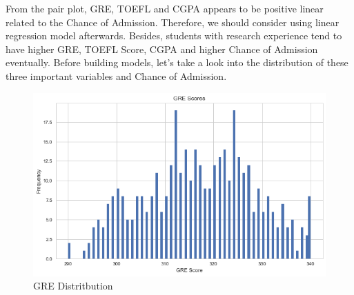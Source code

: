 \documentclass[12pt]{article}
\begin{document}
\begin{sloppypar}
From the pair plot, GRE, TOEFL and CGPA appears to be positive linear related to the Chance of Admission. Therefore, we should consider using linear regression model afterwards. Besides, students with research experience tend to have higher GRE, TOEFL Score, CGPA and higher Chance of Admission eventually. Before building models, let's take a look into the distribution of these three important variables and Chance of Admission.\\


\begin{figure}[H]
    \centering
    \includegraphics[scale = 0.6]{GRE.png}
    \caption{GRE Distritbution}
\end{figure}
 

\end{sloppypar}
\end{document}
